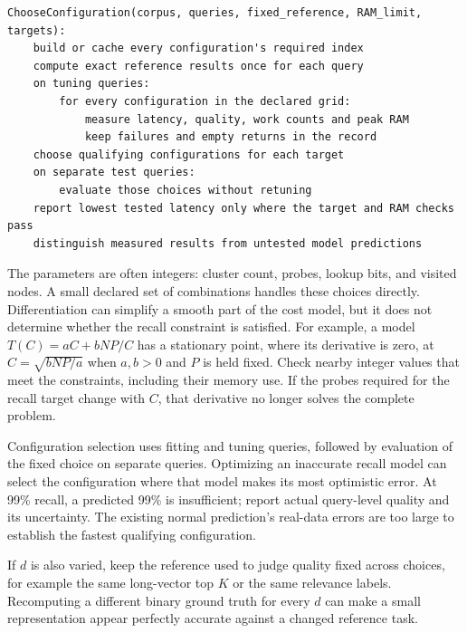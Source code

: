 \par\noindent\begin{minipage}{\linewidth}
\begin{lstlisting}[caption={A defensible finite-grid experiment.}]
ChooseConfiguration(corpus, queries, fixed_reference, RAM_limit, targets):
    build or cache every configuration's required index
    compute exact reference results once for each query
    on tuning queries:
        for every configuration in the declared grid:
            measure latency, quality, work counts and peak RAM
            keep failures and empty returns in the record
    choose qualifying configurations for each target
    on separate test queries:
        evaluate those choices without retuning
    report lowest tested latency only where the target and RAM checks pass
    distinguish measured results from untested model predictions
\end{lstlisting}
\end{minipage}\par

The parameters are often integers: cluster count, probes, lookup bits, and visited nodes. A
small declared set of combinations handles these choices directly. Differentiation can simplify a smooth
part of the cost model, but it does not determine whether the recall constraint is satisfied.
For example, a model $T(C)=aC+bNP/C$ has a stationary point, where its derivative is zero, at
$C=\sqrt{bNP/a}$ when $a,b>0$ and $P$ is held fixed. Check nearby integer values that meet the constraints, including
their memory use. If the probes required for the recall target change with $C$, that derivative no
longer solves the complete problem.

Configuration selection uses fitting and tuning queries, followed by evaluation of the fixed
choice on separate queries. Optimizing an inaccurate recall model can select the configuration where
that model makes its most optimistic error. At 99\% recall, a predicted 99\% is insufficient;
report actual query-level quality and its uncertainty. The existing normal prediction's
real-data errors are too large to establish the fastest qualifying configuration.

If $d$ is also varied, keep the reference used to judge quality fixed across choices, for example the same
long-vector top $K$ or the same relevance labels. Recomputing a different binary ground truth
for every $d$ can make a small representation appear perfectly accurate against a changed reference task.

